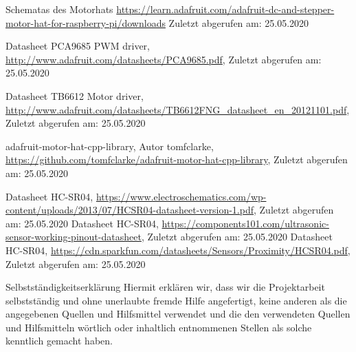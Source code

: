 \documentclass[12pt]{report}
\begin{document}
\begin{thebibliography}{9}

  Schematas des Motorhats
  \url{https://learn.adafruit.com/adafruit-dc-and-stepper-motor-hat-for-raspberry-pi/downloads}
  Zuletzt abgerufen am: 25.05.2020

  Datasheet PCA9685 PWM driver,
  \url{http://www.adafruit.com/datasheets/PCA9685.pdf},
  Zuletzt abgerufen am: 25.05.2020

  Datasheet TB6612 Motor driver,
  \url{http://www.adafruit.com/datasheets/TB6612FNG_datasheet_en_20121101.pdf},
  Zuletzt abgerufen am: 25.05.2020

  adafruit-motor-hat-cpp-library,
  Autor tomfclarke,
  \url{https://github.com/tomfclarke/adafruit-motor-hat-cpp-library},
  Zuletzt abgerufen am: 25.05.2020


  Datasheet HC-SR04,
  \url{https://www.electroschematics.com/wp-content/uploads/2013/07/HCSR04-datasheet-version-1.pdf},
  Zuletzt abgerufen am: 25.05.2020
  Datasheet HC-SR04,
  \url{https://components101.com/ultrasonic-sensor-working-pinout-datasheet},
  Zuletzt abgerufen am: 25.05.2020
  Datasheet HC-SR04,
  \url{https://cdn.sparkfun.com/datasheets/Sensors/Proximity/HCSR04.pdf},
  Zuletzt abgerufen am: 25.05.2020

\end{thebibliography}


\pagebreak
\begin{section}{Selbstständigkeitserklärung}
  Hiermit erklären wir, dass wir die Projektarbeit selbstständig und ohne
  unerlaubte fremde Hilfe angefertigt, keine anderen als die
  angegebenen Quellen und Hilfsmittel verwendet und die den verwendeten Quellen
  und Hilfsmitteln wörtlich oder inhaltlich entnommenen Stellen als solche kenntlich
  gemacht haben.
\end{section}
\end{document}
